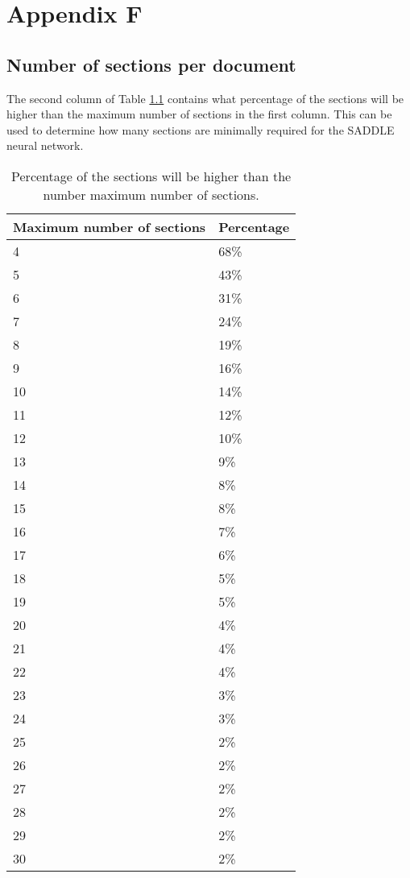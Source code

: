 \appendix 

\chapter{Appendix F}
\label{appendix:appSectioncutoff}
\section{Number of sections per document }

The second column of Table \ref{tabSectioncutoff} contains what percentage of the sections will be higher than the maximum number of sections in the first column. This can be used to determine how many sections are minimally required for the SADDLE neural network.
\begin{table}[!ht]
    \centering
\captionsetup{justification=centering}
    \begin{tabular}{|l|l|}
    \hline
        Maximum number of sections & Percentage \\ \hline
4 & 68\% \\ \hline
5 & 43\% \\ \hline
6 & 31\% \\ \hline
7 & 24\% \\ \hline
8 & 19\% \\ \hline
9 & 16\% \\ \hline
10 & 14\% \\ \hline
11 & 12\% \\ \hline
12 & 10\% \\ \hline
13 & 9\% \\ \hline
14 & 8\% \\ \hline
15 & 8\% \\ \hline
16 & 7\% \\ \hline
17 & 6\% \\ \hline
18 & 5\% \\ \hline
19 & 5\% \\ \hline
20 & 4\% \\ \hline
21 & 4\% \\ \hline
22 & 4\% \\ \hline
23 & 3\% \\ \hline
24 & 3\% \\ \hline
25 & 2\% \\ \hline
26 & 2\% \\ \hline
27 & 2\% \\ \hline
28 & 2\% \\ \hline
29 & 2\% \\ \hline
30 & 2\% \\ \hline
    \end{tabular}
        \caption{Percentage of the sections will be higher than the number maximum number of sections.}
	\label{tabSectioncutoff}
\end{table}

